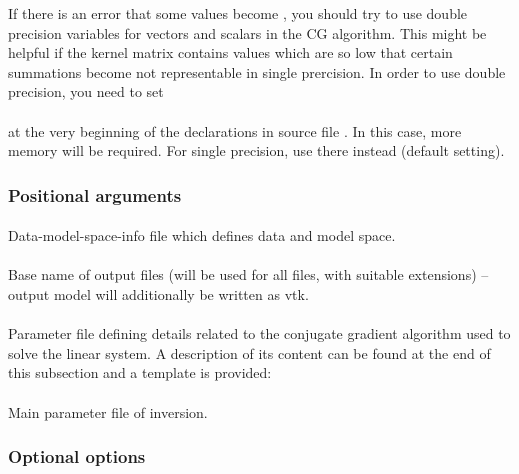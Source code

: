 If there is an error that some values become  , you should try to use double precision
variables for vectors and scalars in the CG algorithm. This might be 
helpful if the kernel matrix contains values which are so low that certain summations 
become not representable in single prercision.
In order to use double precision, you need to set\\
\\
at the very beginning of the declarations in source file  .
In this case, more memory will be required. For single precision, use  there instead (default
setting).
\subsubsection{Positional arguments}
\paragraph{}
Data-model-space-info file which defines data and model space.
\paragraph{}
Base name of output files (will be used for all files, with suitable extensions) -- output model will additionally be written as vtk.
\paragraph{}
Parameter file defining details related to the conjugate gradient algorithm used to solve the linear system.
A description of its content can be found at the end of this subsection and a template is provided:\\
\paragraph{}
Main parameter file of inversion.
\subsubsection{Optional options}

